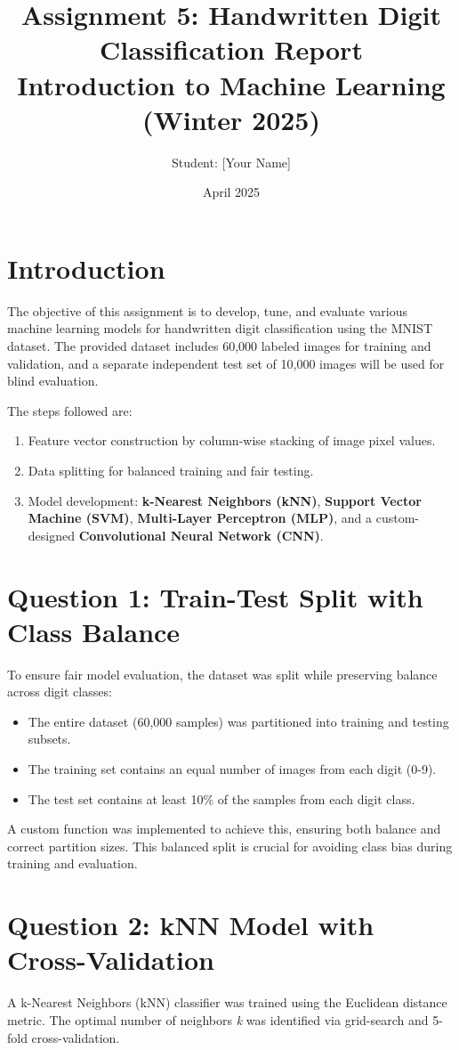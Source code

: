 \documentclass[12pt]{article}
\title{Assignment 5: Handwritten Digit Classification Report\\\vspace{0.5em} \large Introduction to Machine Learning (Winter 2025)}
\author{Student: [Your Name]}
\date{April 2025}
\begin{document}
\maketitle

\section*{Introduction}
The objective of this assignment is to develop, tune, and evaluate various machine learning models for handwritten digit classification using the MNIST dataset. The provided dataset includes 60,000 labeled images for training and validation, and a separate independent test set of 10,000 images will be used for blind evaluation.

The steps followed are:
\begin{enumerate}
    \item Feature vector construction by column-wise stacking of image pixel values.
    \item Data splitting for balanced training and fair testing.
    \item Model development: \textbf{k-Nearest Neighbors (kNN)}, \textbf{Support Vector Machine (SVM)}, \textbf{Multi-Layer Perceptron (MLP)}, and a custom-designed \textbf{Convolutional Neural Network (CNN)}.
\end{enumerate}

\section*{Question 1: Train-Test Split with Class Balance}
To ensure fair model evaluation, the dataset was split while preserving balance across digit classes:

\begin{itemize}
    \item The entire dataset (60,000 samples) was partitioned into training and testing subsets.
    \item The training set contains an equal number of images from each digit (0-9).
    \item The test set contains at least 10\% of the samples from each digit class.
\end{itemize}

A custom function was implemented to achieve this, ensuring both balance and correct partition sizes. This balanced split is crucial for avoiding class bias during training and evaluation.

\section*{Question 2: kNN Model with Cross-Validation}
A k-Nearest Neighbors (kNN) classifier was trained using the Euclidean distance metric. The optimal number of neighbors \textit{k} was identified via grid-search and 5-fold cross-validation.
\end{document}
